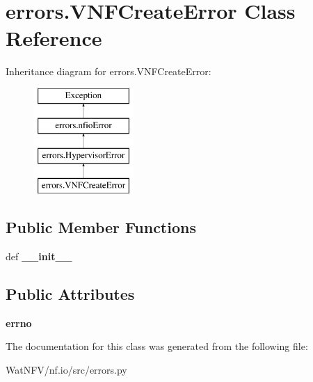 \hypertarget{classerrors_1_1VNFCreateError}{\section{errors.\-V\-N\-F\-Create\-Error Class Reference}
\label{classerrors_1_1VNFCreateError}
}
Inheritance diagram for errors.\-V\-N\-F\-Create\-Error\-:\begin{figure}[H]
\begin{center}
\leavevmode
\includegraphics[height=4.000000cm]{classerrors_1_1VNFCreateError}
\end{center}
\end{figure}
\subsection*{Public Member Functions}
\begin{DoxyCompactItemize}
\item 
\hypertarget{classerrors_1_1VNFCreateError_ab23a6006da644303d74177322b2dda27}{def {\bfseries \-\_\-\-\_\-init\-\_\-\-\_\-}}\label{classerrors_1_1VNFCreateError_ab23a6006da644303d74177322b2dda27}

\end{DoxyCompactItemize}
\subsection*{Public Attributes}
\begin{DoxyCompactItemize}
\item 
\hypertarget{classerrors_1_1VNFCreateError_ae18f480a2baf26f11e0b7c37db441930}{{\bfseries errno}}\label{classerrors_1_1VNFCreateError_ae18f480a2baf26f11e0b7c37db441930}

\end{DoxyCompactItemize}


The documentation for this class was generated from the following file\-:\begin{DoxyCompactItemize}
\item 
Wat\-N\-F\-V/nf.\-io/src/errors.\-py\end{DoxyCompactItemize}
